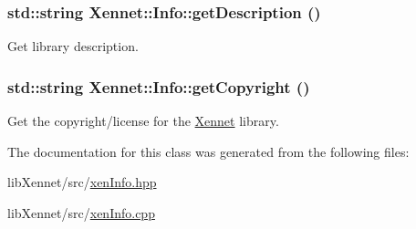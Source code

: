 \hypertarget{classXennet_1_1Info_b21e95c576ae048cd14918543b6cafc8}{
\subsubsection{\setlength{\rightskip}{0pt plus 5cm}std::string Xennet::Info::getDescription ()}}
\label{classXennet_1_1Info_b21e95c576ae048cd14918543b6cafc8}


Get library description. 

\hypertarget{classXennet_1_1Info_f53b1dc1edc80f1068fa5fc59820333f}{
\subsubsection{\setlength{\rightskip}{0pt plus 5cm}std::string Xennet::Info::getCopyright ()}}
\label{classXennet_1_1Info_f53b1dc1edc80f1068fa5fc59820333f}


Get the copyright/license for the \hyperlink{namespaceXennet}{Xennet} library. 



The documentation for this class was generated from the following files:\begin{CompactItemize}
\item 
libXennet/src/\hyperlink{xenInfo_8hpp}{xenInfo.hpp}\item 
libXennet/src/\hyperlink{xenInfo_8cpp}{xenInfo.cpp}\end{CompactItemize}
